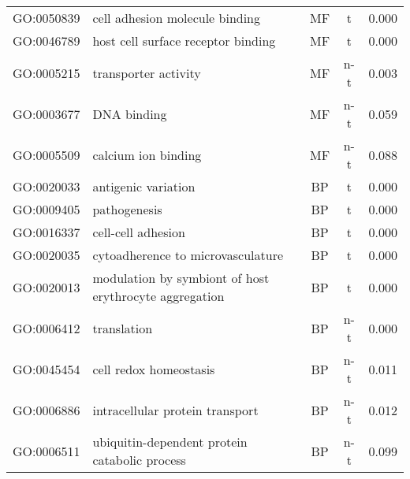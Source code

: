 \documentclass{article}
\begin{document}
\begin{table}
\begin{center}
\begin{tabular}{llccc}
GO:0050839 & cell adhesion molecule binding & MF & t & 0.000\\
GO:0046789 & host cell surface receptor binding & MF & t & 0.000\\
GO:0005215 & transporter activity & MF & n-t & 0.003\\
GO:0003677 & DNA binding & MF & n-t & 0.059\\
GO:0005509 & calcium ion binding & MF & n-t & 0.088\\
GO:0020033 & antigenic variation & BP & t & 0.000\\
GO:0009405 & pathogenesis & BP & t & 0.000\\
GO:0016337 & cell-cell adhesion & BP & t & 0.000\\
GO:0020035 & cytoadherence to microvasculature & BP & t & 0.000\\
GO:0020013 & modulation by symbiont of host erythrocyte aggregation & BP & t & 0.000\\
GO:0006412 & translation & BP & n-t & 0.000\\
GO:0045454 & cell redox homeostasis & BP & n-t & 0.011\\
GO:0006886 & intracellular protein transport & BP & n-t & 0.012\\
GO:0006511 & ubiquitin-dependent protein catabolic process & BP & n-t & 0.099\\
\hline
\end{tabular}
\end{center}
\label{table:TrophsFirstPro}
\end{table}
\clearpage
\end{document}
